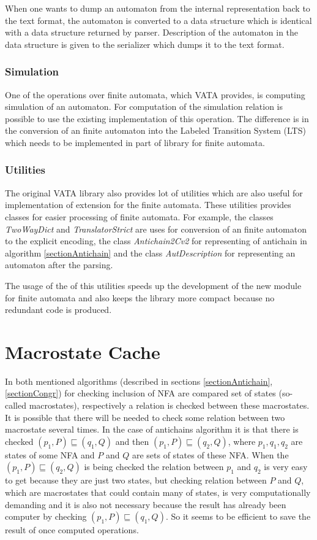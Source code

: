 When one wants to dump an automaton from the internal representation back to the text format, 
the automaton is converted to a data structure which is identical with a data structure returned by parser. Description of the automaton in the
data structure is given to the serializer which dumps it to the text format.

\subsubsection{Simulation}
One of the operations over finite automata, which VATA provides, is computing simulation of an automaton. For computation of the simulation relation
is possible to use the existing implementation of this operation. 
The difference is in the conversion of an finite automaton into the Labeled Transition System (LTS) which
needs to be implemented in part of library for finite automata.

\subsubsection{Utilities}
The original VATA library also provides lot of utilities which are also useful for implementation of extension for the finite automata. These utilities
provides classes for easier processing of finite automata. For example, the classes \emph{TwoWayDict} and \emph{TranslatorStrict} are uses for conversion
of an finite automaton to the explicit encoding, the class \emph{Antichain2Cv2} for representing of antichain in algorithm \ref{sectionAntichain} 
and the class \emph{AutDescription} for representing an automaton after the parsing.

The usage of the of this utilities speeds up the development of the new module for finite automata and also keeps the library more compact because no
redundant code is produced.

\section{Macrostate Cache}
\label{sectionCache}
In both mentioned algorithms (described in sections \ref{sectionAntichain},\ref{sectionCongr}) for checking inclusion of NFA are 
compared set of states (so-called macrostates), 
respectively a relation is checked between these macrostates. It is possible that there will be needed to check some relation between
two macrostate several times. In the case of antichains algorithm it is that there is checked $(p_1,P) \sqsubseteq (q_1,Q)$ and then $(p_1,P)\sqsubseteq
(q_2,Q)$, where $p_1,q_1,q_2$ are states of some NFA and $P$ and $Q$ are sets of states of these NFA. 
When the $(p_1,P)\sqsubseteq(q_2,Q)$ is being checked the relation between $p_1$ and $q_2$ is very easy to get because they are just two states, but checking
relation between $P$ and $Q$, which are macrostates that could contain many of states, is very computationally demanding and it is also not necessary because
the result has already been computer by checking $(p_1,P) \sqsubseteq (q_1,Q)$. So it seems to be efficient to save the result of once computed
operations.

